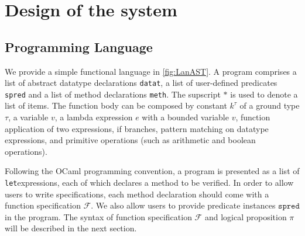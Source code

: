 
\chapter{Design of the system}
\label{ch:design}
\vspace{2em}


\section{Programming Language}

We provide a simple functional language in \autoref{fig:LanAST}. A program
comprises a list of abstract datatype declarations \texttt{datat}, a list of user-defined predicates \texttt{spred} and a list of method declarations
\texttt{meth}. The supscript $*$ is used to denote a list of items. The function
body can be composed by constant $k^{\tau}$ of a ground type $\tau$, a variable $v$, a lambda expression $e$ with a bounded variable $v$, 
function application of two expressions, if branches, pattern matching on datatype
expressions, and primitive operations (such as arithmetic and boolean operations).

Following the OCaml programming convention, a program is presented as a 
list of \texttt{let}\zz{}expressions, each of which declares a method to be
verified. In order to allow users to write specifications, each method
declaration should come with a function specification $\mathcal{F}$. 
We also allow users to provide predicate instances $\texttt{spred}$ in
the program. The syntax of function specification $\mathcal{F}$ and 
logical proposition $\pi$ will be described in the next section.

